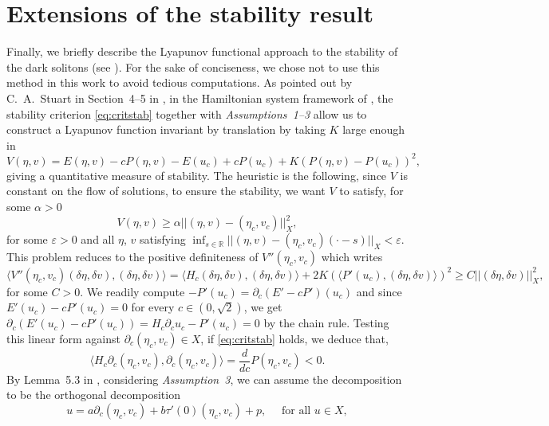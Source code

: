 \documentclass[11pt]{article}
\newcommand{\R}{\mathbb{R}}
\theoremstyle{plain}
\theoremstyle{definition}
\theoremstyle{remark}
\numberwithin{equation}{section}
\begin{document}
{	\section{Extensions of the stability result}\label{appendix}
	Finally, we briefly describe the Lyapunov functional approach to the stability of the dark solitons (see \cite{chiron-stability}). 
	For the sake of conciseness, we chose not to use this method in this work to avoid tedious computations.
	As pointed out by C.~A.~Stuart in Section~4--5 in \cite{stuartstab}, in the Hamiltonian system framework of \cite{grillakisshatah}, the stability criterion \eqref{eq:critstab} together with \textit{Assumptions~1--3} allow us to construct a Lyapunov function invariant by translation by taking $K$ large enough in 
	\begin{equation}\label{eq:lyap}
		V(\eta,v)=E(\eta,v)-cP(\eta,v)-E(u_{c})+cP(u_{c})+K(P(\eta,v)-P(u_{c}))^2,
	\end{equation} giving a quantitative measure of stability. The heuristic is the following, since $V$ is constant on the flow of solutions, to ensure the stability, we want $V$ to satisfy, for some $\alpha>0$ $$V(\eta,v)\geq\alpha ||(\eta,v)-(\eta_{c},v_{c}) ||^2_{X},$$ for some $\varepsilon>0$ and all $\eta$, $v$ satisfying $\inf_{s\in\R}||(\eta,v)-(\eta_{c},v_{c})(\cdot-s) ||_{X}<\varepsilon$. This problem reduces to the positive definiteness of $V''(\eta_{c},v_{c})$ which writes
	$$\langle V''(\eta_{c},v_{c})(\delta\eta,\delta v),(\delta\eta,\delta v)\rangle=\langle H_c(\delta\eta,\delta v),(\delta\eta,\delta v)\rangle+2K(\langle P'(u_{c}),(\delta\eta,\delta v)\rangle )^2 \geq C||(\delta\eta,\delta v) ||^2_{X},$$
	for some $C>0$.
	We readily compute $-P'(u_{c})=\partial_c(E'-cP')(u_{c})$ and since $E'(u_c)-cP'(u_{c})=0$ for every $c\in(0,\sqrt{2})$, we get $\partial_c(E'(u_c)-cP'(u_{c}))=H_c\partial_cu_{c}-P'(u_{c})=0$ by the chain rule. Testing this linear form against $\partial_c(\eta_c,v_c)\in X$, if \eqref{eq:critstab} holds, we deduce that,
	\begin{equation}\label{eq:dcu}
		\langle H_c\partial_c(\eta_c,v_c),\partial_c(\eta_c,v_c)\rangle=\frac{d}{dc}P(\eta_c,v_c)<0.
	\end{equation}
	By Lemma~5.3 in \cite{stuartstab}, considering \textit{Assumption~3}, we can assume the decomposition to be the orthogonal decomposition  
	\begin{equation}
		u=a\partial_c(\eta_c,v_c)+b\tau'(0)(\eta_c,v_c)+p, \quad\text{ for all }u\in X,

\end{equation}}
\end{document}
